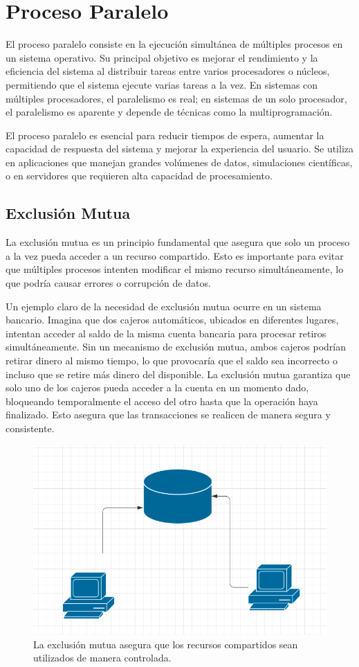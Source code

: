 \section{Proceso Paralelo}

El proceso paralelo consiste en la ejecución simultánea de múltiples procesos en un sistema operativo. Su principal objetivo es mejorar el rendimiento y la eficiencia del sistema al distribuir tareas entre varios procesadores o núcleos, permitiendo que el sistema ejecute varias tareas a la vez. En sistemas con múltiples procesadores, el paralelismo es real; en sistemas de un solo procesador, el paralelismo es aparente y depende de técnicas como la multiprogramación.

El proceso paralelo es esencial para reducir tiempos de espera, aumentar la capacidad de respuesta del sistema y mejorar la experiencia del usuario. Se utiliza en aplicaciones que manejan grandes volúmenes de datos, simulaciones científicas, o en servidores que requieren alta capacidad de procesamiento.

\subsection{Exclusión Mutua}

La exclusión mutua es un principio fundamental que asegura que solo un proceso a la vez pueda acceder a un recurso compartido. Esto es importante para evitar que múltiples procesos intenten modificar el mismo recurso simultáneamente, lo que podría causar errores o corrupción de datos.

Un ejemplo claro de la necesidad de exclusión mutua ocurre en un sistema bancario. Imagina que dos cajeros automáticos, ubicados en diferentes lugares, intentan acceder al saldo de la misma cuenta bancaria para procesar retiros simultáneamente. Sin un mecanismo de exclusión mutua, ambos cajeros podrían retirar dinero al mismo tiempo, lo que provocaría que el saldo sea incorrecto o incluso que se retire más dinero del disponible. La exclusión mutua garantiza que solo uno de los cajeros pueda acceder a la cuenta en un momento dado, bloqueando temporalmente el acceso del otro hasta que la operación haya finalizado. Esto asegura que las transacciones se realicen de manera segura y consistente.

\begin{figure}[H] \centering \includegraphics[width=0.8\linewidth]{Imagenes/exclusion.png} \caption{La exclusión mutua asegura que los recursos compartidos sean utilizados de manera controlada.} \end{figure}

